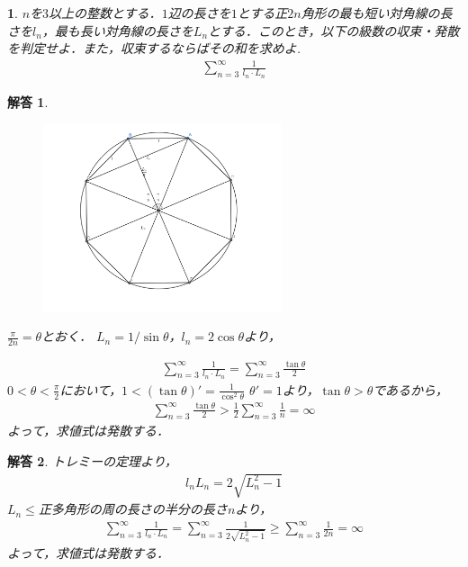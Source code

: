 \documentclass[dvipdfmx]{jsarticle}
\newtheorem{prob}{}[]
\newtheorem{answer}{解答}
\begin{document}
\newpage

\begin{screen}
  \begin{prob}
    $n$を$3$以上の整数とする．$1$辺の長さを$1$とする正$2n$角形の最も短い対角線の長さを$l_{n}$，最も長い対角線の長さを$L_{n}$とする．このとき，以下の級数の収束・発散を判定せよ．また，収束するならばその和を求めよ.
  \begin{align*}
    \sum_{n=3}^{\infty}{\frac{1}{l_{n}\cdot L_{n}}}
  \end{align*} 
  \end{prob}
\end{screen}
\begin{answer}
  \begin{figure}[h]
    \centering
    \includegraphics[width=7cm]{AMC002-picture/mathtest1.png}
    \caption {}\label{ex1}
  \end{figure}
    $\frac{\pi}{2n}=\theta $とおく．
    $L_{n}=1/\sin \theta$，$l_{n}=2\cos \theta$より，
    
  \begin{align*}
    \sum_{n=3}^{\infty}{\frac{1}{l_{n}\cdot L_{n}}}=\sum_{n=3}^{\infty}\frac{\tan \theta}{2}
  \end{align*}
    $0<\theta<\frac{\pi}{2}$において，$1<(\tan \theta)'=\frac{1}{\cos ^{2}\theta}$
    $\theta '=1$より，$\tan \theta >\theta$であるから，
  \begin{align*}
    \sum_{n=3}^{\infty}\frac{\tan \theta}{2}>\frac{1}{2}\sum_{n=3}^{\infty}\frac{1}{n}=\infty
  \end{align*}
    よって，求値式は発散する．\\
    \rightline{$\Box $}
\end{answer}
\begin{answer}
  トレミーの定理より，
  \begin{align*}
    l_{n}L_{n}=2\sqrt{L^{2}_{n}-1}
  \end{align*}
  $L_{n}\leq $正多角形の周の長さの半分の長さ$n$より，
  \begin{align*}
    \sum_{n=3}^{\infty}{\frac{1}{l_{n}\cdot L_{n}}}=\sum_{n=3}^{\infty}{\frac{1}{2\sqrt{L^{2}_{n}-1}}}
    \geq \sum_{n=3}^{\infty}\frac{1}{2n}=\infty
  \end{align*}
  よって，求値式は発散する．\\
  \rightline{$\Box $}
\end{answer}
 
\end{document}
